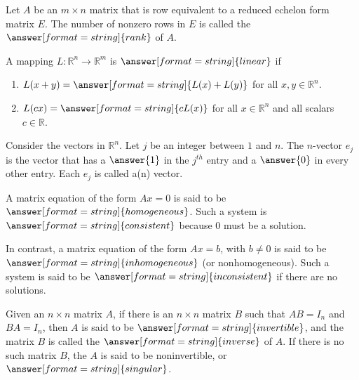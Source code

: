 \documentclass{ximera}
\begin{document}
\begin{question}
Let $A$ be an $m \times n$ matrix that is row equivalent to a reduced echelon form matrix $E$. 
The number of nonzero rows in $E$ is called the $\answer[format=string]{rank}$ of $A$.
\end{question} 

\begin{question}
A mapping $L: \mathbb{R}^n \to \mathbb{R}^m$ is $\answer[format=string]{linear}$ if 
\begin{enumerate}
\item $L(x+y)=\answer[format=string]{L(x)+L(y)}$ for all $x,y\in \mathbb{R}^n$. 
\item $L(cx)=\answer[format=string]{cL(x)}$ for all $x\in \mathbb{R}^n$ and all scalars $c\in \mathbb{R}$.
\end{enumerate}
\end{question} 

\begin{question}
Consider the vectors in $\mathbb{R}^n$.  Let $j$ be an integer between $1$ and $n$. The $n$-vector $e_j$ is the vector that has a $\answer{1}$ in the $j^{th}$ entry and a $\answer{0}$ in every other entry. Each $e_j$ is called a(n) 
 vector.  
\end{question} 

\begin{question}
A matrix equation of the form $Ax=0$ is said to be $\answer[format=string]{homogeneous}$.  Such a system is $\answer[format=string]{consistent}$ because $0$ must be a solution.  

In contrast, a matrix equation of the form $Ax=b$, with $b\ne 0$ is said to be $\answer[format=string]{inhomogeneous}$ (or nonhomogeneous).  Such a system is said to be $\answer[format=string]{inconsistent}$ if there are no solutions.  
\end{question}

\begin{question}
Given an $n \times n$ matrix $A$, if there is an $n \times n$ matrix $B$ such that 
$AB=I_n$ and $BA=I_n$, then $A$ is said to be $\answer[format=string]{invertible}$, and the matrix $B$ is called the $\answer[format=string]{inverse}$ of $A$. If there is no such matrix $B$, the $A$ is said to be noninvertible, or $\answer[format=string]{singular}$. 
\end{question} 
\end{document}
